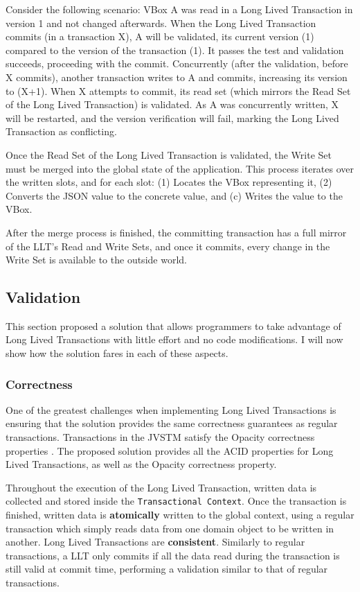 \documentclass{llncs}
\begin{document}
Consider the following scenario: VBox A was read in a Long Lived
Transaction in version 1 and not changed afterwards. When the Long
Lived Transaction commits (in a transaction X), A will be validated,
its current version (1) compared to the version of the transaction
(1). It passes the test and validation succeeds, proceeding with the
commit. Concurrently (after the validation, before X commits), another
transaction writes to A and commits, increasing its version to (X+1). When
X attempts to commit, its read set (which mirrors the Read Set of the
Long Lived Transaction) is validated. As A was concurrently written, X
will be restarted, and the version verification will fail, marking the
Long Lived Transaction as conflicting.

Once the Read Set of the Long Lived Transaction is validated, the
Write Set must be merged into the global state of the
application. This process iterates over the written slots, and for
each slot: (1) Locates the VBox representing it, (2) Converts the JSON
value to the concrete value, and (c) Writes the value to the VBox.

After the merge process is finished, the committing transaction has a
full mirror of the LLT's Read and Write Sets, and once it commits,
every change in the Write Set is available to the outside world.

\subsection{Validation}
\label{sec:validation}

This section proposed a solution that allows programmers to take
advantage of Long Lived Transactions with little effort and no code
modifications. I will now show how the solution fares in each of these
aspects.

\subsubsection{Correctness}

One of the greatest challenges when implementing Long Lived
Transactions is ensuring that the solution provides the same
correctness guarantees as regular transactions. Transactions in the
JVSTM satisfy the Opacity correctness properties
\cite{guerraoui2008correctness}. The proposed solution provides all
the ACID properties for Long Lived Transactions, as well as the
Opacity correctness property.

Throughout the execution of the Long Lived Transaction, written data
is collected and stored inside the \texttt{Transactional Context}. Once
the transaction is finished, written data is {\bf atomically} written
to the global context, using a regular transaction which simply reads
data from one domain object to be written in another.  Long Lived
Transactions are {\bf consistent}. Similarly to regular transactions,
a LLT only commits if all the data read during the transaction is
still valid at commit time, performing a validation similar to that of
regular transactions.
\end{document}

